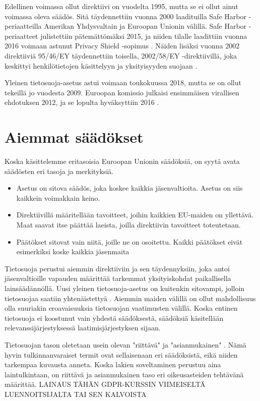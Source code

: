 \documentclass[finnish]{tktltiki}
\begin{document}
Edellinen voimassa ollut direktiivi on vuodelta 1995, mutta se ei ollut ainut voimassa oleva säädös. Sitä täydennettiin vuonna 2000 laadituilla Safe Harbor -periaatteilla Amerikan Yhdysvaltain ja Euroopan Unionin välillä. Safe Harbor -periaatteet julistettiin pätemättömäksi 2015, ja niiden tilalle laadittiin vuonna 2016 voimaan astunut Privacy Shield -sopimus \cite{privacy,tikkinen}. Näiden lisäksi vuonna 2002 direktiiviä 95/46/EY täydennettiin toisella, 2002/58/EY -direktiivillä, joka keskittyi henkilötietojen käsittelyyn ja yksityisyyden suojaan \cite{eu2002,tikkinen}. 

Yleinen tietosuoja-asetus astui voimaan toukokuussa 2018, mutta se on ollut tekeillä jo vuodesta 2009. Euroopan komissio julkaisi ensimmäisen virallisen ehdotuksen 2012, ja se lopulta hyväksyttiin 2016 \cite{eu2016,tikkinen}.


\newpage
\section{Aiemmat säädökset}

Koska käsittelemme eritasoisia Euroopan Unionin säädöksiä, on syytä avata säädösten eri tasoja ja merkityksiä.
\begin{itemize}
\item Asetus on sitova säädös, joka koskee kaikkia jäsenvaltioita. Asetus on siis kaikkein voimakkain keino. \cite{europa}
\item Direktiivillä määritellään tavoitteet, joihin kaikkien EU-maiden on yllettävä. Maat saavat itse päättää laeista, joilla direktiivin tavoitteet toteutetaan. \cite{europa}
\item Päätökset sitovat vain niitä, joille ne on osoitettu. Kaikki päätökset eivät esimerkiksi koske kaikkia jäsenmaita \cite{europa}
\end{itemize}
Tietosuoja perustui aiemmin direktiiviin ja sen täydennyksiin, joka antoi jäsenvaltioille vapauden määrittää tarkemmat yksityiskohdat paikallisella lainsäädännöllä. Uusi yleinen tietosuoja-asetus on kuitenkin sitovampi, jolloin tietosuojaa saatiin yhtenäistettyä \cite{eu2016,europa}. Aiemmin maiden välillä on ollut mahdollisuus olla suuriakin eroavaisuuksia tietosuojan vaatimusten välillä. Koska entinen tietosuoja ei koostunut vain yhdestä säädöksestä, säädöksiä käsitellään relevanssijärjestyksessä laatimisjärjestyksen sijaan.

Tietosuojan tason oletetaan usein olevan "riittävä" ja "asianmukainen" \cite{eu95,eu2016}. Nämä hyvin tulkinnanvaraiset termit ovat sellaisenaan eri säädöksistä, eikä niiden tarkempaa kuvausta anneta. Koska lakien soveltaminen perustuu aina laintulkintaan, on riittävä ja asianmukainen taso eri oikeusasteiden tehtävänä määrittää. LAINAUS TÄHÄN GDPR-KURSSIN VIIMEISELTÄ LUENNOITSIJALTA TAI SEN KALVOISTA
\end{document}

